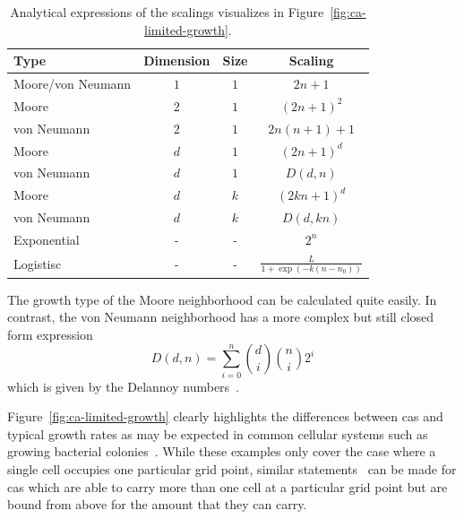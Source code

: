 \begin{table}
    \centering
    \begin{tabular}{lccc}
        Type & Dimension & Size & Scaling\\
        \midrule
        Moore/von Neumann   & $1$ & $1$ & $2n+1$\\
        Moore               & $2$ & $1$ & $(2n+1)^2$\\
        von Neumann         & $2$ & $1$ & $2n(n+1)+1$\\
        Moore               & $d$ & $1$ & $(2n+1)^d$\\
        von Neumann         & $d$ & $1$ & $D(d,n)$\\
        Moore               & $d$ & $k$ & $(2kn+1)^d$\\
        von Neumann         & $d$ & $k$ & $D(d,kn)$\\
        \midrule
        Exponential         & -   & -   & $2^n$\\
        Logistisc           & -   & -   & $\frac{L}{1+\exp(-k(n-n_0))}$\\
        \bottomrule
    \end{tabular}
    \caption[Analytical Scalings of Figure~\ref{fig:ca-limited-growth}]{
        Analytical expressions of the scalings visualizes in Figure~\ref{fig:ca-limited-growth}.
    }
    \label{tab:ca-growth-scaling}
\end{table}

The growth type of the Moore neighborhood can be calculated quite easily.
In contrast, the von Neumann neighborhood has a more complex but still closed form expression
\begin{equation}
    D(d,n) = \sum\limits_{i=0}^n\binom{d}{i}\binom{n}{i}2^i
\end{equation}
which is given by the Delannoy numbers~\cite{Delannoy1895,Banderier2005,Zaitsev2017}.

Figure~\ref{fig:ca-limited-growth} clearly highlights the differences between \acp{ca} and typical
growth rates as may be expected in common cellular systems such as growing bacterial
colonies~\cite{Zwietering1990}.
While these examples only cover the case where a single cell occupies one particular grid point,
similar statements~\cite{Gravner1998} can be made for \acp{ca} which are able to carry more than one
cell at a particular grid point but are bound from above for the amount that they can carry.

